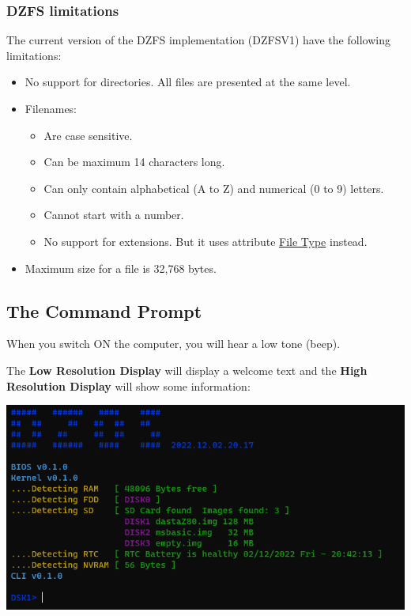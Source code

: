         \subsubsection{DZFS limitations}
        The current version of the DZFS implementation (DZFSV1) have the following
        limitations:

        \begin{itemize}
            \item No support for directories. All files are presented at the same
            level.
            \item Filenames:
            \begin{itemize}
                \item Are case sensitive.
                \item Can be maximum 14 characters long.
                \item Can only contain alphabetical (A to Z) and numerical (0 to 9)
                    letters.
                \item Cannot start with a number.
                \item No support for extensions. But it uses attribute
                    \hyperref[subsub:filetypes]{File Type} instead.
            \end{itemize}
            \item Maximum size for a file is 32,768 bytes.
        \end{itemize}
        
    \subsection{The Command Prompt}
    When you switch ON the computer, you will hear a low tone (beep).

    The \textbf{Low Resolution Display} will display a welcome text and the 
    \textbf{High Resolution Display} will show some information:

    \includegraphics[scale=0.6]{images/dzOS.png}

